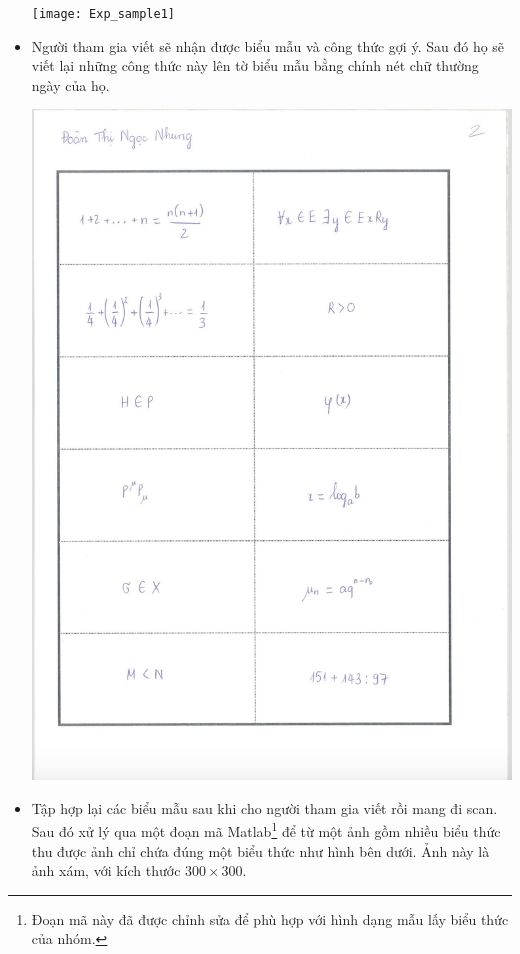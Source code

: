 \documentclass[a4paper]{article}
\theoremstyle{definition}
\begin{document}
\begin{itemize}
		\begin{center}
			\centering
			\texttt{[image: Exp\_sample1]}
			\vspace{0.5cm}
		\end{center}
		\item Người tham gia viết sẽ nhận được biểu mẫu và công thức gợi ý. Sau đó họ sẽ viết lại những công thức này lên tờ biểu mẫu bằng chính nét chữ thường ngày của họ. 
		\begin{center}
			\centering
			\includegraphics[width=0.8\linewidth]{Exp_sample_vd}
			\vspace{0.5cm}
		\end{center}
		\item Tập hợp lại các biểu mẫu sau khi cho người tham gia viết rồi mang đi scan. Sau đó xử lý qua một đoạn mã Matlab\cite{qak}\footnote{Đoạn mã này đã được chỉnh sửa để phù hợp với hình dạng mẫu lấy biểu thức của nhóm.} để từ một ảnh gồm nhiều biểu thức thu được ảnh chỉ chứa đúng một biểu thức như hình bên dưới. Ảnh này là ảnh xám, với kích thước $300\times300$.
		\begin{center}

\end{center}
\end{itemize}
\end{document}
